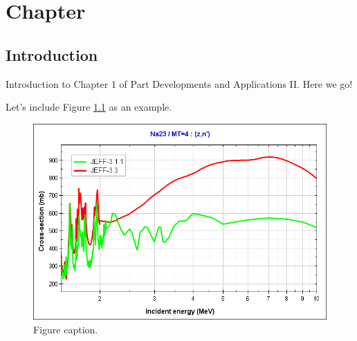 \chapter{Chapter}
\label{sect:devs02_chapter1}

\section{Introduction}
\label{sect::devs02_chapter1_intro}

Introduction to Chapter 1 of Part Developments and Applications II. Here we go!

Let's include Figure \ref{fig::figure01} as an example.

\begin{figure}[h!]
	\begin{center}
		\includegraphics[width=1\textwidth]{TeX_files/Developments_and_applications_p2/Figures/na23-mt4-XS-jeff33-jeff311.png}
		\caption{Figure caption.}
		\label{fig::figure01}
	\end{center}
\end{figure}